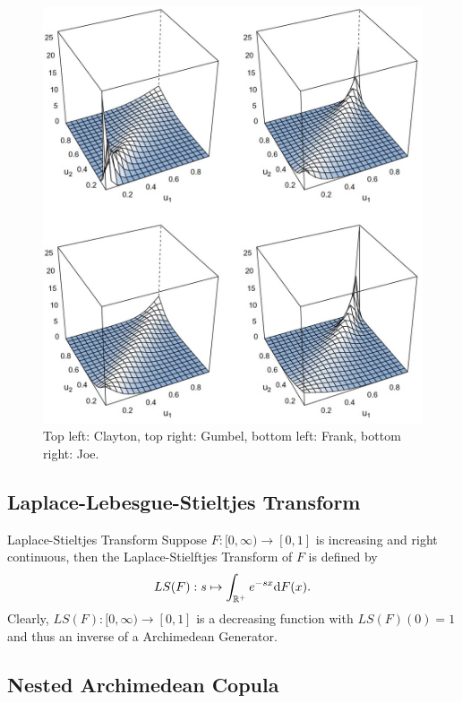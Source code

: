 \documentclass[12pt]{article}
\begin{document}
\begin{figure}[htb]
	\centering
	\includegraphics[scale=0.3]{figure/Archimedean.jpeg}
	\caption{Top left: Clayton, top right: Gumbel, bottom left: Frank, bottom right: Joe.}
\end{figure}


\subsection{Laplace-Lebesgue-Stieltjes Transform}
\begin{sdefinition}{Laplace-Stieltjes Transform}{}
Suppose $F:[0,\infty)\to[0,1]$ is increasing and right continuous, then the Laplace-Stielftjes Transform of $F$ is defined by 
$$
LS(F): s\mapsto \int_{\mathbb{R}^+} e^{-sx}\mathrm{d} F(x).
$$
Clearly, $LS(F): [0,\infty) \to [0,1]$ is a decreasing function with $LS(F)(0)=1$ and thus an inverse of a Archimedean Generator.
\end{sdefinition}
 
\subsection{Nested Archimedean Copula}
\end{document}
